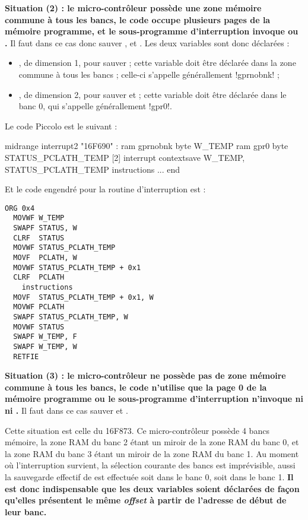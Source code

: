 \textbf{Situation (2) : le micro-contrôleur possède une zone mémoire commune à tous les bancs, le code occupe plusieurs pages de la mémoire programme, et le sous-programme d'interruption invoque  ou .} Il faut dans ce cas donc sauver ,  et . Les deux variables sont donc déclarées :
\begin{itemize}
  \item {}, de dimension 1, pour sauver  ; cette variable doit être déclarée dans la zone commune à tous les bancs ; celle-ci s'appelle générallement \pic!gprnobnk! ; 
  \item {}, de dimension 2, pour sauver  et   ; cette variable doit être déclarée dans le banc 0, qui s'appelle générallement \pic!gpr0!. 
\end{itemize}



Le code Piccolo est le suivant :
\begin{piccolo}
midrange interrupt2 "16F690" :
ram gprnobnk {
  byte W_TEMP
}
ram gpr0 {
  byte STATUS_PCLATH_TEMP [2]
}
interrupt contextsave W_TEMP, STATUS_PCLATH_TEMP {
  instructions
}
...
end
\end{piccolo}

Et le code engendré pour la routine d'interruption est :
\begin{lstlisting}[language=assembleur]
  ORG 0x4
  MOVWF W_TEMP
  SWAPF STATUS, W
  CLRF  STATUS
  MOVWF STATUS_PCLATH_TEMP
  MOVF  PCLATH, W
  MOVWF STATUS_PCLATH_TEMP + 0x1
  CLRF  PCLATH
    instructions
  MOVF  STATUS_PCLATH_TEMP + 0x1, W
  MOVWF PCLATH
  SWAPF STATUS_PCLATH_TEMP, W
  MOVWF STATUS
  SWAPF W_TEMP, F
  SWAPF W_TEMP, W
  RETFIE
\end{lstlisting}







\textbf{Situation (3) : le micro-contrôleur ne possède pas de zone mémoire commune à tous les bancs, le code n'utilise que la page 0 de la mémoire programme ou le sous-programme d'interruption n'invoque ni  ni .} Il faut dans ce cas sauver  et .

Cette situation est celle du 16F873. Ce micro-contrôleur possède 4 bancs mémoire, la zone RAM du banc 2 étant un miroir de la zone RAM du banc 0, et la zone RAM du banc 3 étant un miroir de la zone RAM du banc 1. Au moment où l'interruption survient, la sélection courante des bancs est imprévisible, aussi la sauvegarde effectif de  est effectuée soit dans le banc 0, soit dans le banc 1. \textbf{Il est donc indispensable que les deux variables soient déclarées de façon qu'elles présentent le même \emph{offset} à partir de l'adresse de début de leur banc.}

